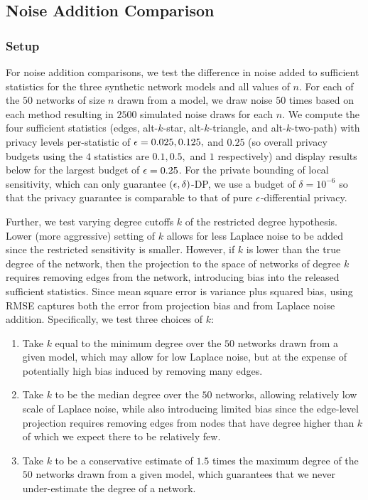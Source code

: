  \subsection{Noise Addition Comparison}
 
 \subsubsection{Setup}
 For noise addition comparisons, we test the difference in noise added to sufficient statistics for the three synthetic network models and all values of $n$. For each of the $50$ networks of size $n$ drawn from a model, we draw noise $50$ times based on each method resulting in $2500$ simulated noise draws for each $n$. We compute the four sufficient statistics (edges, alt-$k$-star, alt-$k$-triangle, and alt-$k$-two-path) with privacy levels per-statistic of $\epsilon = 0.025, 0.125,$ and $0.25$ (so overall privacy budgets using the $4$ statistics are $0.1, 0.5,$ and $1$ respectively) and display results below for the largest budget of $\epsilon = 0.25$. For the private bounding of local sensitivity, which can only guarantee $(\epsilon, \delta)$-DP, we use a budget of $\delta = 10^{-6}$ so that the privacy guarantee is comparable to that of pure $\epsilon$-differential privacy. 
 
 Further, we test varying degree cutoffs $k$ of the restricted degree hypothesis. Lower (more aggressive) setting of $k$ allows for less Laplace noise to be added since the restricted sensitivity is smaller. However, if $k$ is lower than the true degree of the network, then the projection to the space of networks of degree $k$ requires removing edges from the network, introducing bias into the released sufficient statistics.  Since mean square error is variance plus squared bias, using RMSE captures both the error from projection bias and from Laplace noise addition. Specifically, we test three choices of $k$:
 \vspace{-0.2in}
\begin{enumerate}
	\item Take $k$ equal to the minimum degree over the $50$ networks drawn from a given model, which may allow for low Laplace noise, but at the expense of potentially high bias induced by removing many edges.
	\item Take $k$ to be the median degree over the $50$ networks, allowing relatively low scale of Laplace noise, while also introducing limited bias since the edge-level projection  requires removing edges from nodes that have degree higher than $k$ of which we expect there to be relatively few.
	\item Take $k$ to be a conservative estimate of $1.5$ times the maximum degree of the $50$ networks drawn from a given model, which guarantees that we never under-estimate the degree of a network. 
\end{enumerate}

